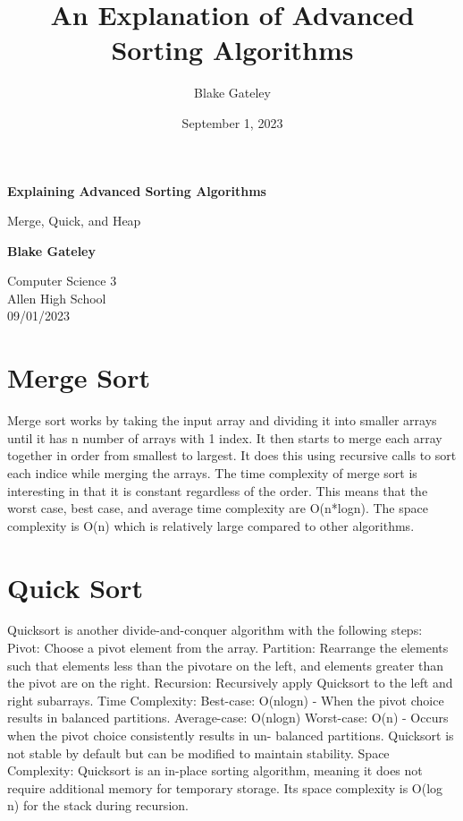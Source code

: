 \documentclass[12pt]{article}
\title{An Explanation of Advanced Sorting Algorithms}
\author{Blake Gateley}
\date{September 1, 2023}
\begin{document}
\begin{titlepage}
   \begin{center}
       \vspace*{1cm}

       {\Huge \textbf{Explaining Advanced Sorting Algorithms}}

       \vspace{0.5cm}
       Merge, Quick, and Heap%
                 
       \vspace{1.5cm}

       \textbf{Blake Gateley}


       
       \vfill
            
       
            
       \vspace{0.8cm}
     
   
            
       Computer Science 3\\
       Allen High School\\
       09/01/2023
            
   \end{center}
\end{titlepage}
\tableofcontents

\newpage
\section{Merge Sort}
Merge sort works by taking the input array and dividing it into smaller arrays until it has n number of arrays with 1 index. It then starts to merge each array together in order from smallest to largest. It does this using recursive calls to sort each indice while merging the arrays. The time complexity of merge sort is interesting in that it is constant regardless of the order. This means that the worst case, best case, and average time complexity are O(n*logn). The space complexity is O(n) which is relatively large compared to other algorithms.

\newpage
\section{Quick Sort}
Quicksort is another divide-and-conquer algorithm with the following steps:
Pivot: Choose a pivot element from the array.
Partition: Rearrange the elements such that elements less than the pivotare on the left, and elements greater than the pivot are on the right.
Recursion: Recursively apply Quicksort to the left and right subarrays.
Time Complexity:
Best-case: O(nlogn) - When the pivot choice results in balanced partitions.
Average-case: O(nlogn)
Worst-case: O(n) - Occurs when the pivot choice consistently results in un-
balanced partitions.
Quicksort is not stable by default but can be modified to maintain stability.
Space Complexity:
Quicksort is an in-place sorting algorithm, meaning it does not require additional memory for temporary storage. Its space complexity is O(log n) for the stack during recursion.
\end{document}
